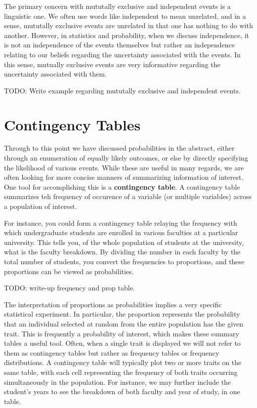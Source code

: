 \documentclass[
  letterpaper,
  DIV=11,
  numbers=noendperiod]{scrreprt}
\begin{document}
The primary concern with mututally exclusive and independent events is a
linguistic one. We often use words like independent to mean unrelated,
and in a sense, mututally exclusive events are unrelated in that one has
nothing to do with another. However, in statistics and probability, when
we discuss independence, it is not an independence of the events
themselves but rather an independence relating to our beliefs regarding
the uncertainty associated with the events. In this sense, mutually
exclusive events are very informative regarding the uncertainty
associated with them.

TODO: Write example regarding mututally exclusive and independent
events.

\section{Contingency Tables}\label{contingency-tables}

Through to this point we have discussed probabilities in the abstract,
either through an enumeration of equally likely outcomes, or else by
directly specifying the likelihood of various events. While these are
useful in many regards, we are often looking for more concise manners of
summarizing information of interest. One tool for accomplishing this is
a \textbf{contingency table}. A contingency table summarizes teh
frequency of occurence of a variable (or multiple variables) across a
population of interest.

For instance, you could form a contingency table relaying the frequency
with which undergraduate students are enrolled in various faculties at a
particular university. This tells you, of the whole population of
students at the university, what is the faculty breakdown. By dividing
the number in each faculty by the total number of students, you convert
the frequencies to proportions, and these proportions can be viewed as
probabilities.

TODO: write-up frequency and prop table.

The interpretation of proportions as probabilities implies a very
specific statistical experiment. In particular, the proportion
represents the probability that an individual selected at random from
the entire population has the given trait. This is frequently a
probability of interest, which makes these summary tables a useful tool.
Often, when a single trait is displayed we will not refer to them as
contingency tables but rather as frequency tables or frequency
distributions. A contingency table will typically plot two or more
traits on the same table, with each cell representing the frequency of
both traits occurring simultaneously in the population. For instance, we
may further include the student's years to see the breakdown of both
faculty and year of study, in one table.
\end{document}
